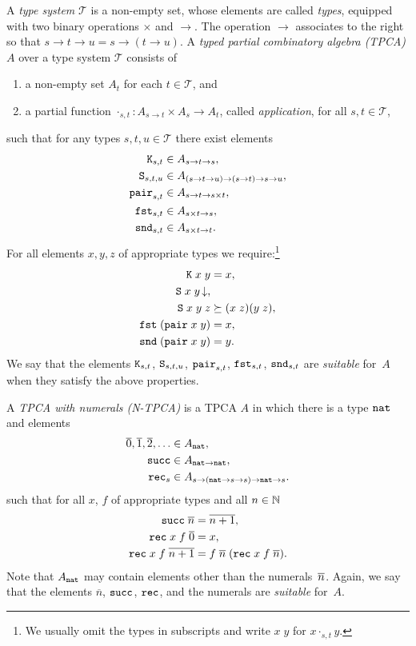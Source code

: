 A \emph{type system} $\mathcal{T}$ is a non-empty set, whose elements
are called \emph{types}, equipped with two binary operations $\times$
and $\to$. The operation $\to$ associates to the right so that $s \to
t \to u = s \to (t \to u)$. A \emph{typed partial combinatory algebra
  (TPCA)} $A$ over a type system $\mathcal{T}$ consists of
%
\begin{enumerate}
\item a non-empty set $A_t$ for each $t \in \mathcal{T}$, and
\item a partial function $\cdot_{s,t} : A_{s \to t} \times A_s \to
  A_t$, called \emph{application}, for all $s, t \in \mathcal{T}$,
\end{enumerate}
%
such that for any types $s, t, u \in \mathcal{T}$ there exist elements
%
\begin{align*}
  \mathtt{K}_{s,t} &\in A_{s \to t \to s}, \\
  \mathtt{S}_{s,t,u} &\in A_{(s \to t \to u) \to (s \to t) \to s \to u}, \\
  \mathtt{pair}_{s,t} &\in A_{s \to t \to s \times t}, \\
  \mathtt{fst}_{s,t} &\in A_{s \times t \to s}, \\
  \mathtt{snd}_{s,t} &\in A_{s \times t \to t}.
\end{align*}
%
For all elements $x, y, z$ of appropriate types we require:\footnote{We
  usually omit the types in subscripts and write $x \; y$ for $x
  \cdot_{s,t} y$.}
%
\begin{align*}
  \mathtt{K} \; x \; y &= x, \\
  \mathtt{S} \; x \; y\,{\downarrow}, & \\
  \mathtt{S} \; x \; y \; z &\succeq  (x \; z) (y \; z), \\
  \mathtt{fst} \; (\mathtt{pair} \; x \; y) &= x, \\
  \mathtt{snd} \; (\mathtt{pair} \; x \; y) &= y.
\end{align*}
%
We say that the elements $\mathtt{K}_{s,t}$, $\mathtt{S}_{s,t,u}$,
$\mathtt{pair}_{s,t}$, $\mathtt{fst}_{s,t}$, $\mathtt{snd}_{s,t}$ are
\emph{suitable} for~$A$ when they satisfy the above properties.

A \emph{TPCA with numerals (N-TPCA)} is a TPCA $A$ in which there is a
type $\mathtt{nat}$ and elements
%
\begin{align*}
  \overline{0}, \overline{1}, \overline{2}, \ldots &\in A_{\mathtt{nat}}, \\
  \mathtt{succ} &\in A_{\mathtt{nat} \to \mathtt{nat}}, \\
  \mathtt{rec}_s &\in A_{s \to (\mathtt{nat} \to s \to s) \to \mathtt{nat} \to s}.
\end{align*}
%
such that for all $x$, $f$ of appropriate types and all $n \in \mathbb{N}$
%
\begin{align*}
  \mathtt{succ} \; \overline{n} &= \overline{n + 1}, \\
  \mathtt{rec} \; x \; f \; \overline{0} &= x, \\
  \mathtt{rec} \; x \; f \; \overline{n+1} &=
  f \; \overline{n} \; (\mathtt{rec} \; x \; f \; \overline{n}).
\end{align*}
%
Note that $A_{\mathtt{nat}}$ may contain elements other than the
numerals~$\overline{n}$. Again, we say that the elements
$\overline{n}$, $\mathtt{succ}$, $\mathtt{rec}$, and the numerals are
\emph{suitable} for~$A$.

